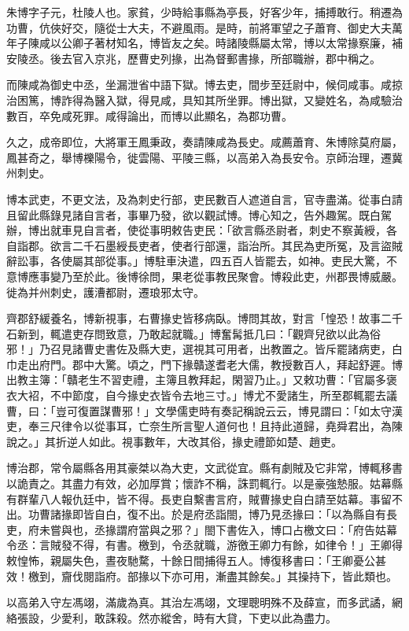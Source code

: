 \begin{pinyinscope}
朱博字子元，杜陵人也。家貧，少時給事縣為亭長，好客少年，捕搏敢行。稍遷為功曹，伉俠好交，隨從士大夫，不避風雨。是時，前將軍望之子蕭育、御史大夫萬年子陳咸以公卿子著材知名，博皆友之矣。時諸陵縣屬太常，博以太常掾察廉，補安陵丞。後去官入京兆，歷曹史列掾，出為督郵書掾，所部職辦，郡中稱之。

而陳咸為御史中丞，坐漏泄省中語下獄。博去吏，間步至廷尉中，候伺咸事。咸掠治困篤，博詐得為醫入獄，得見咸，具知其所坐罪。博出獄，又變姓名，為咸驗治數百，卒免咸死罪。咸得論出，而博以此顯名，為郡功曹。

久之，成帝即位，大將軍王鳳秉政，奏請陳咸為長史。咸薦蕭育、朱博除莫府屬，鳳甚奇之，舉博櫟陽令，徙雲陽、平陵三縣，以高弟入為長安令。京師治理，遷冀州刺史。

博本武吏，不更文法，及為刺史行部，吏民數百人遮道自言，官寺盡滿。從事白請且留此縣錄見諸自言者，事畢乃發，欲以觀試博。博心知之，告外趣駕。既白駕辦，博出就車見自言者，使從事明敕告吏民：「欲言縣丞尉者，刺史不察黃綬，各自詣郡。欲言二千石墨綬長吏者，使者行部還，詣治所。其民為吏所冤，及言盜賊辭訟事，各使屬其部從事。」博駐車決遣，四五百人皆罷去，如神。吏民大驚，不意博應事變乃至於此。後博徐問，果老從事教民聚會。博殺此吏，州郡畏博威嚴。徙為并州刺史，護漕都尉，遷琅邪太守。

齊郡舒緩養名，博新視事，右曹掾史皆移病臥。博問其故，對言「惶恐！故事二千石新到，輒遣吏存問致意，乃敢起就職。」博奮髯抵几曰：「觀齊兒欲以此為俗邪！」乃召見諸曹史書佐及縣大吏，選視其可用者，出教置之。皆斥罷諸病吏，白巾走出府門。郡中大驚。頃之，門下掾贛遂耆老大儒，教授數百人，拜起舒遲。博出教主簿：「贛老生不習吏禮，主簿且教拜起，閑習乃止。」又敕功曹：「官屬多褒衣大袑，不中節度，自今掾史衣皆令去地三寸。」博尤不愛諸生，所至郡輒罷去議曹，曰：「豈可復置謀曹邪！」文學儒吏時有奏記稱說云云，博見謂曰：「如太守漢吏，奉三尺律令以從事耳，亡奈生所言聖人道何也！且持此道歸，堯舜君出，為陳說之。」其折逆人如此。視事數年，大改其俗，掾史禮節如楚、趙吏。

博治郡，常令屬縣各用其豪桀以為大吏，文武從宜。縣有劇賊及它非常，博輒移書以詭責之。其盡力有效，必加厚賞；懷詐不稱，誅罰輒行。以是豪強慹服。姑幕縣有群輩八人報仇廷中，皆不得。長吏自繫書言府，賊曹掾史自白請至姑幕。事留不出。功曹諸掾即皆自白，復不出。於是府丞詣閤，博乃見丞掾曰：「以為縣自有長吏，府未嘗與也，丞掾謂府當與之邪？」閤下書佐入，博口占檄文曰：「府告姑幕令丞：言賊發不得，有書。檄到，令丞就職，游徼王卿力有餘，如律令！」王卿得敕惶怖，親屬失色，晝夜馳騖，十餘日間捕得五人。博復移書曰：「王卿憂公甚效！檄到，齎伐閱詣府。部掾以下亦可用，漸盡其餘矣。」其操持下，皆此類也。

以高弟入守左馮翊，滿歲為真。其治左馮翊，文理聰明殊不及薛宣，而多武譎，網絡張設，少愛利，敢誅殺。然亦縱舍，時有大貸，下吏以此為盡力。


\end{pinyinscope}
